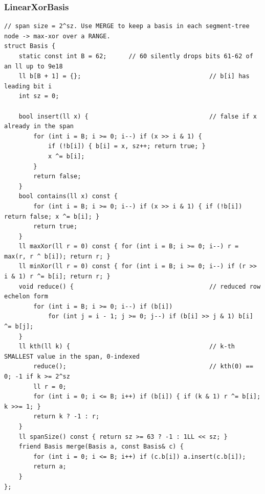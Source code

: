 \documentclass[9pt,a4paper,twocolumn]{extarticle}
\begin{document}
\subsubsection{LinearXorBasis}
\nopagebreak
\begin{lstlisting}
// span size = 2^sz. Use MERGE to keep a basis in each segment-tree node -> max-xor over a RANGE.
struct Basis {
    static const int B = 62;      // 60 silently drops bits 61-62 of an ll up to 9e18
    ll b[B + 1] = {};                                   // b[i] has leading bit i
    int sz = 0;

    bool insert(ll x) {                                 // false if x already in the span
        for (int i = B; i >= 0; i--) if (x >> i & 1) {
            if (!b[i]) { b[i] = x, sz++; return true; }
            x ^= b[i];
        }
        return false;
    }
    bool contains(ll x) const {
        for (int i = B; i >= 0; i--) if (x >> i & 1) { if (!b[i]) return false; x ^= b[i]; }
        return true;
    }
    ll maxXor(ll r = 0) const { for (int i = B; i >= 0; i--) r = max(r, r ^ b[i]); return r; }
    ll minXor(ll r = 0) const { for (int i = B; i >= 0; i--) if (r >> i & 1) r ^= b[i]; return r; }
    void reduce() {                                     // reduced row echelon form
        for (int i = B; i >= 0; i--) if (b[i])
            for (int j = i - 1; j >= 0; j--) if (b[i] >> j & 1) b[i] ^= b[j];
    }
    ll kth(ll k) {                                      // k-th SMALLEST value in the span, 0-indexed
        reduce();                                       // kth(0) == 0; -1 if k >= 2^sz
        ll r = 0;
        for (int i = 0; i <= B; i++) if (b[i]) { if (k & 1) r ^= b[i]; k >>= 1; }
        return k ? -1 : r;
    }
    ll spanSize() const { return sz >= 63 ? -1 : 1LL << sz; }
    friend Basis merge(Basis a, const Basis& c) {
        for (int i = 0; i <= B; i++) if (c.b[i]) a.insert(c.b[i]);
        return a;
    }
};
\end{lstlisting}

\filbreak
\end{document}
